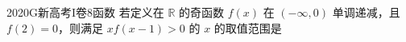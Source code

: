
\begin{problem}{2020}{G}{新高考I卷}{8}{函数}
若定义在 $\mathbb{R}$ 的奇函数 $ f(x) $ 在 $ (-\infty,0) $ 单调递减，且 $ f(2)=0 $，则满足 $ xf(x-1)>0 $ 的 $ x $ 的取值范围是
\begin{choices}
\choice{{${[-1,1]}\cup{[3,+\infty)}$}}
\choice{{${[-3,-1]}\cup{[0,1]}$}}
\choice{{${[-1,0]}\cup{[1,+\infty)}$}}
\choice{{${[-1,0]}\cup{[1,3]}$}}
\end{choices}
\end{problem}

\begin{answer}

\end{answer}

\begin{solutions}

\end{solutions}